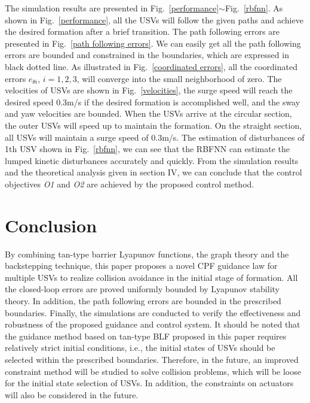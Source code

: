 \documentclass[conference,letterpaper,10.5pt]{IEEEtran}
\begin{document}
The simulation results are presented in Fig.~\ref{performance}$\sim$Fig.~\ref{rbfnn}. As shown in Fig.~\ref{performance}, all the USVs will follow the given paths and achieve the desired formation after a brief transition. The path following errors are presented in Fig.~\ref{path following errors}. We can easily get all the path following errors are bounded and constrained in the boundaries, which are expressed in black dotted line. As illustrated in Fig.~\ref{coordinated errors}, all the coordinated errors $e_{\theta i}$, $i=1,2,3$, will converge into the small neighborhood of zero. The velocities of USVs are shown in Fig.~\ref{velocities}, the surge speed will reach the desired speed 0.3m/s if the desired formation is accomplished well, and the sway and yaw velocities are bounded. When the USVs arrive at the circular section, the outer USVs will speed up to maintain the formation. On the straight section, all USVs will maintain a surge speed of 0.3m/s. The estimation of disturbances of 1th USV shown in Fig.~\ref{rbfnn}, we can see that the RBFNN can estimate the lumped kinetic disturbances accurately and quickly. From the simulation results and the theoretical analysis given in section IV, we can conclude that the control objectives \emph{O1} and \emph{O2} are achieved by the proposed control method.

\section{Conclusion}
By combining tan-type barrier Lyapunov functions, the graph theory and the backstepping technique, this paper proposes a novel CPF guidance law for multiple USVs to realize collision avoidance in the initial stage of formation. All the closed-loop errors are proved uniformly bounded by Lyapunov stability theory. In addition, the path following errors are bounded in the prescribed boundaries. Finally, the simulations are conducted to verify the effectiveness and robustness of the proposed guidance and control system. It should be noted that the guidance method based on tan-type BLF proposed in this paper requires relatively strict initial conditions, i.e., the initial states of USVs should be selected within the prescribed boundaries. Therefore, in the future, an improved constraint method will be studied to solve collision problems, which will be loose for the initial state selection of USVs. In addition, the constraints on actuators will also be considered in the future.

%
\end{document}

